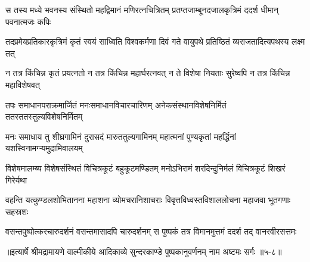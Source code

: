 
\twolineshloka
{स तस्य मध्ये भवनस्य संस्थितो महद्विमानं मणिरत्नचित्रितम्}
{प्रतप्तजाम्बूनदजालकृत्रिमं ददर्श धीमान् पवनात्मजः कपिः} %

\twolineshloka
{तदप्रमेयप्रतिकारकृत्रिमं कृतं स्वयं साध्विति विश्वकर्मणा}
{दिवं गते वायुपथे प्रतिष्ठितं व्यराजतादित्यपथस्य लक्ष्म तत्} %

\twolineshloka
{न तत्र किंचिन्न कृतं प्रयत्नतो न तत्र किंचिन्न महार्घरत्नवत्}
{न ते विशेषा नियताः सुरेष्वपि न तत्र किंचिन्न महाविशेषवत्} %

\twolineshloka
{तपः समाधानपराक्रमार्जितं मनःसमाधानविचारचारिणम्}
{अनेकसंस्थानविशेषनिर्मितं ततस्ततस्तुल्यविशेषनिर्मितम्} %

\twolineshloka
{मनः समाधाय तु शीघ्रगामिनं दुरासदं मारुततुल्यगामिनम्}
{महात्मनां पुण्यकृतां महर्द्धिनां यशस्विनामग्ऱ्यमुदामिवालयम्} %

\twolineshloka
{विशेषमालम्ब्य विशेषसंस्थितं विचित्रकूटं बहुकूटमण्डितम्}
{मनोऽभिरामं शरदिन्दुनिर्मलं विचित्रकूटं शिखरं गिरेर्यथा} %

\twolineshloka
{वहन्ति यत्कुण्डलशोभितानना महाशना व्योमचरानिशाचराः}
{विवृत्तविध्वस्तविशाललोचना महाजवा भूतगणाः सहस्रशः} %

\twolineshloka
{वसन्तपुष्पोत्करचारुदर्शनं वसन्तमासादपि चारुदर्शनम्}
{स पुष्पकं तत्र विमानमुत्तमं ददर्श तद् वानरवीरसत्तमः} %


॥इत्यार्षे श्रीमद्रामायणे वाल्मीकीये आदिकाव्ये सुन्दरकाण्डे पुष्पकानुवर्णनम् नाम अष्टमः सर्गः ॥५-८॥
